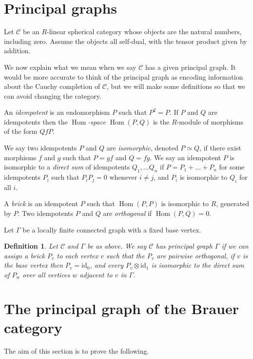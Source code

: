 \documentclass{article}
\DeclareMathOperator{\Hom}{Hom}
\newcommand{\id}{\mathrm{id}}
\newtheorem{definition}[theorem]{Definition}
\begin{document}
\section{Principal graphs}

Let $\mathcal{C}$ be an $R$-linear spherical category whose objects are
the natural numbers, including zero.  Assume the objects all self-dual,
with the tensor product given by addition.

We now explain what we mean when we say $\mathcal{C}$ has a
given principal graph.  It would be more accurate to think of the
principal graph as encoding information about the Cauchy completion of
$\mathcal{C}$, but we will make some definitions so that we can avoid
changing the category.

An \emph{idempotent} is an endomorphism $P$ such that $P^2=P$.  If $P$
and $Q$ are idempotents then the \emph{$\Hom$-space} $\Hom(P,Q)$ is
the $R$-module of morphisms of the form $QfP$.

We say two idempotents $P$ and $Q$ are \emph{isomorphic}, denoted
$P \simeq Q$, if there exist morphisms $f$ and $g$ such that $P=gf$ and
$Q=fg$.  We say an idempotent $P$ is isomorphic to a \emph{direct sum}
of idempotents $Q_1,\dots Q_n$ if $P=P_1+\dots+P_n$ for some idempotents
$P_i$ such that $P_iP_j=0$ whenever $i\neq j$, and $P_i$ is isomorphic
to $Q_i$ for all $i$.

A \emph{brick} is an idempotent $P$ such that $\Hom(P,P)$ is isomorphic to
$R$, generated by $P$.  Two idempotents $P$ and $Q$ are \emph{orthogonal}
if $\Hom(P,Q)=0$.

Let $\Gamma$ be a locally finite connected graph with a fixed base vertex.

\begin{definition}
\label{def:principal}
Let $\mathcal{C}$ and $\Gamma$ be as above.  We say $\mathcal{C}$
has \emph{principal graph} $\Gamma$ if we can assign a brick $P_v$
to each vertex $v$ such that the $P_v$ are pairwise orthogonal, if $v$
is the base vertex then $P_v=\id_0$, and every $P_v \otimes \id_1$ is
isomorphic to the direct sum of $P_w$ over all vertices $w$ adjacent to
$v$ in $\Gamma$.
\end{definition}

\section{The principal graph of the Brauer category}

The aim of this section is to prove the following.
\end{document}
